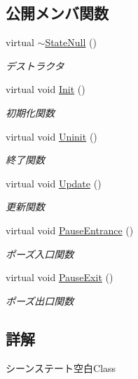 \subsection*{公開メンバ関数}
\begin{DoxyCompactItemize}
\item 
virtual \mbox{\hyperlink{class_scene_null_1_1_state_null_a5e4b7bef40fa261c7ca3fb1b4feed137}{$\sim$\+State\+Null}} ()
\begin{DoxyCompactList}\small\item\em デストラクタ \end{DoxyCompactList}\item 
virtual void \mbox{\hyperlink{class_scene_null_1_1_state_null_ac0b3f1adf01b580144337e37a847131f}{Init}} ()
\begin{DoxyCompactList}\small\item\em 初期化関数 \end{DoxyCompactList}\item 
virtual void \mbox{\hyperlink{class_scene_null_1_1_state_null_ae6b633f3f092834cea11f489bf41e548}{Uninit}} ()
\begin{DoxyCompactList}\small\item\em 終了関数 \end{DoxyCompactList}\item 
virtual void \mbox{\hyperlink{class_scene_null_1_1_state_null_a835f82c22afb290eca79460450088baf}{Update}} ()
\begin{DoxyCompactList}\small\item\em 更新関数 \end{DoxyCompactList}\item 
virtual void \mbox{\hyperlink{class_scene_null_1_1_state_null_a0a14205bef6c8f73c3ef6b785b104f02}{Pause\+Entrance}} ()
\begin{DoxyCompactList}\small\item\em ポーズ入口関数 \end{DoxyCompactList}\item 
virtual void \mbox{\hyperlink{class_scene_null_1_1_state_null_acf2eecc6ee9f16b57095aa0b88192257}{Pause\+Exit}} ()
\begin{DoxyCompactList}\small\item\em ポーズ出口関数 \end{DoxyCompactList}\end{DoxyCompactItemize}


\subsection{詳解}
シーンステート空白\+Class 


